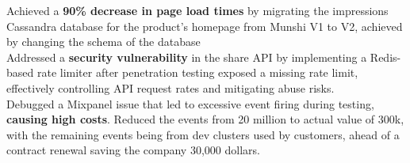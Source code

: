 \documentclass[]{Nikhil_Kadiyan_Resume}
\begin{document}
\pt Achieved a \textbf{90\% decrease in page load times} by migrating the impressions Cassandra database for the product's homepage from Munshi V1 to V2, achieved by changing the schema of the database\\
\pt Addressed a \textbf{security vulnerability} in the share API by implementing a Redis-based rate limiter after penetration testing exposed a missing rate limit, effectively controlling API request rates and mitigating abuse risks.\\
\pt Debugged a Mixpanel issue that led to excessive event firing during testing, \textbf{causing high costs}. Reduced the events from 20 million to actual value of 300k, with the remaining events being from dev clusters used by customers, ahead of a contract renewal saving the company 30,000 dollars.\\ %
\end{document}
